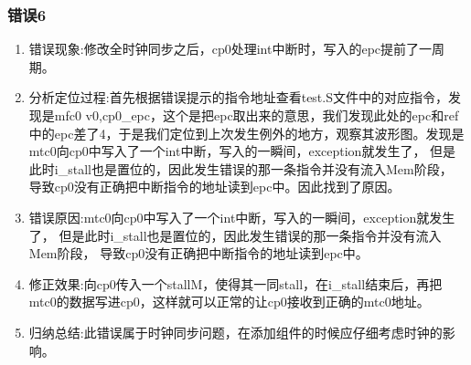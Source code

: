 \subsubsection{错误6}
\begin{enumerate}[(1)]
    \item 错误现象:修改全时钟同步之后，cp0处理int中断时，写入的epc提前了一周期。
    \item 分析定位过程:首先根据错误提示的指令地址查看test.S文件中的对应指令，发现是mfc0 v0,cp0\_epc，这个是把epc取出来的意思，我们发现此处的epc和ref中的epc差了4，于是我们定位到上次发生例外的地方，观察其波形图。发现是mtc0向cp0中写入了一个int中断，写入的一瞬间，exception就发生了， 但是此时i\_stall也是置位的，因此发生错误的那一条指令并没有流入Mem阶段， 导致cp0没有正确把中断指令的地址读到epc中。因此找到了原因。
    \item 错误原因:mtc0向cp0中写入了一个int中断，写入的一瞬间，exception就发生了， 但是此时i\_stall也是置位的，因此发生错误的那一条指令并没有流入Mem阶段， 导致cp0没有正确把中断指令的地址读到epc中。
    \item 修正效果:向cp0传入一个stallM，使得其一同stall，在i\_stall结束后，再把mtc0的数据写进cp0，这样就可以正常的让cp0接收到正确的mtc0地址。
    \item 归纳总结:此错误属于时钟同步问题，在添加组件的时候应仔细考虑时钟的影响。
\end{enumerate}